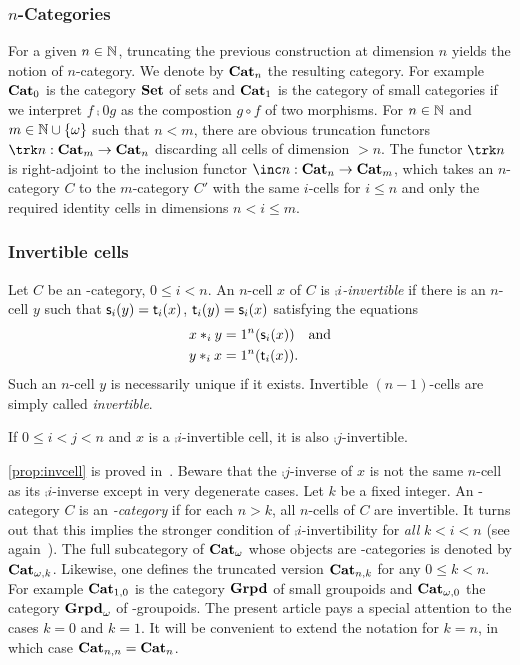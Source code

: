 \subsubsection{$n$-Categories}\label{ssubsec:ncat}
For a given $n\in\mathbb N$, truncating the previous construction at dimension $n$ yields the notion of $n$-category.  We denote by $\mathbf{Cat}_{n}$ the resulting category. For example $\mathbf{Cat}_{0}$ is the category $\mathbf{Set}$ of sets and $\mathbf{Cat}_{1}$ is the category of small categories if we interpret $f\comp 0 g$ as the compostion $g\circ f$ of two morphisms.
For $n\in\mathbb N$ and $m\in\mathbb N\cup \left\{\omega\right\}$ such that $n<m$, there are 
obvious truncation functors $\trk n:\nCat m\to \nCat n$ discarding all cells of dimension $>n$. The functor $\trk n$ is right-adjoint to the inclusion functor  $\inc n:\nCat n\to\nCat m$, which takes an $n$-category $C$ to the $m$-category $C'$ with the same $i$-cells for $i\leq n$ and only the required identity cells in dimensions $n<i\leq m$.

\subsubsection{Invertible cells}\label{ssubsec:invert}
Let $C$ be an \oo-category, $0\leq i <n$. An $n$-cell $x$ of $C$ is {\em $\comp i$-invertible} if there is an $n$-cell $y$ such that $\mathsf{s}_{i}(y)=\mathsf{t}_{i}(x)$, $\mathsf{t}_{i}(y)=\mathsf{s}_{i}(x)$ satisfying the equations 
  \begin{align*}
    x\ast_{i} y & = 1^{n}(\mathsf{s}_{i}(x)) \quad \hbox{and}\\
    y\ast_{i} x & =  1^{n}(\mathsf{t}_{i}(x)).
  \end{align*}
  Such an $n$-cell $y$ is necessarily unique if it exists. Invertible $(n{-}1)$-cells are simply called {\em invertible}. 
  \begin{proposition}\label{prop:invcell}
    If $0\leq i< j<n$ and $x$ is a $\comp i$-invertible cell, it is also $\comp j$-invertible.
  \end{proposition}
  \begin{paragr}
    \cref{prop:invcell} is proved in~\cite[14.5]{abgmmm:polybk}. Beware that the $\comp j$-inverse of $x$ is not the same $n$-cell as its $\comp i$-inverse except in very degenerate cases. Let $k$ be a fixed integer. An \oo-category $C$ is an {\em {}-category} if for each $n>k$, all $n$-cells of $C$ are invertible. It turns out that this implies the stronger condition of $\comp i$-invertibility for {\em all} $k<i<n$ (see again~\cite[14.5]{abgmmm:polybk}).  The full subcategory of $\mathbf{Cat}_{\omega}$ whose objects are -categories is denoted by $\mathbf{Cat}_{\omega,k}$. Likewise, one defines the truncated version $\mathbf{Cat}_{n,k}$ for any $0\leq k<n$.  For example $\mathbf{Cat}_{1,0}$ is the category $\mathbf{Grpd}$ of small groupoids and $\mathbf{Cat}_{\omega,0}$ the category $\mathbf{Grpd}_{\omega}$ of \oo-groupoids. The present article pays a special attention to the cases $k=0$ and $k=1$. It will be convenient to extend the notation for $k=n$, in which case $\mathbf{Cat}_{n,n}=\mathbf{Cat}_{n}$.
 \end{paragr} 


